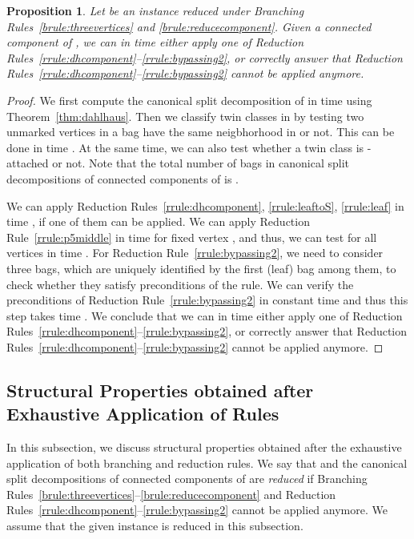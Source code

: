 \documentclass[11pt]{elsarticle}
\newtheorem{PROP}[theorem]{Proposition}
\begin{document}
\begin{PROP}
\label{prop:applicationRR}
 Let  be an instance reduced under Branching Rules~\ref{brule:threevertices} and \ref{brule:reducecomponent}.
Given a connected component  of , we can in time  either apply one of Reduction Rules~\ref{rrule:dhcomponent}--\ref{rrule:bypassing2}, or correctly answer that Reduction Rules~\ref{rrule:dhcomponent}--\ref{rrule:bypassing2} cannot be applied anymore. 
\end{PROP}
\begin{proof}
We first compute the canonical split decomposition  of  in time   using Theorem~\ref{thm:dahlhaus}.
Then we classify twin classes in  by testing two unmarked vertices in a bag have the same neigbhorhood in  or not. 
This can be done in time . 
At the same time, we can also test whether a twin class is -attached or not. 
Note that the total number of bags in canonical split decompositions of connected components of  is .

We can apply Reduction Rules~\ref{rrule:dhcomponent}, \ref{rrule:leaftoS}, \ref{rrule:leaf} in time , if one of them can be applied. 
We can apply Reduction Rule~\ref{rrule:p5middle} in time  for fixed vertex , 
and thus, we can test for all vertices  in time .
For Reduction Rule~\ref{rrule:bypassing2}, we need to consider three bags, which are uniquely identified by the first (leaf) bag among them, to check whether they satisfy preconditions of the rule. We can verify the preconditions of Reduction Rule~\ref{rrule:bypassing2} in constant time and 
thus this step takes time .
We conclude that we can in time  either apply one of Reduction Rules~\ref{rrule:dhcomponent}--\ref{rrule:bypassing2}, or correctly answer that Reduction Rules~\ref{rrule:dhcomponent}--\ref{rrule:bypassing2} cannot be applied anymore. 
\end{proof}




\subsection{Structural Properties obtained after Exhaustive Application of Rules}\label{subsec:structure}

In this subsection, we discuss structural properties obtained after the exhaustive application of both branching and reduction rules.
We say that  and the canonical split decompositions of connected components of  are \emph{reduced} 
if Branching Rules~\ref{brule:threevertices}--\ref{brule:reducecomponent} and Reduction Rules~\ref{rrule:dhcomponent}--\ref{rrule:bypassing2} cannot be applied anymore.
We assume that the given instance is reduced in this subsection.
\end{document}
